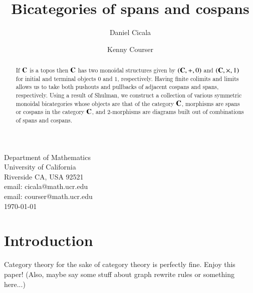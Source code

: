 \documentclass[oneside]{amsart}
\title{Bicategories of spans and cospans}
\author{Daniel Cicala}
\author{Kenny Courser}
\theoremstyle{definition}
\theoremstyle{remark}
\numberwithin{equation}{section}
\begin{document}
\maketitle
\begin{center}   
  {\small Department of Mathematics  \\
    University of California  \\
  Riverside CA, USA 92521  \\ }
  \vspace{0.3cm}   
  {\small email: cicala@math.ucr.edu\\}
  {\small email: courser@math.ucr.edu\\} 
  \vspace{0.3cm}   
  {\small \today}
  \vspace{0.3cm}   
\end{center}   

\begin{abstract}
\noindent
If $\bold{C}$ is a topos then $\bold{C}$ has two monoidal structures given by $(\bold{C},+,0)$ and $(\bold{C},\times,1)$ for initial and terminal objects $0$ and $1$, respectively. Having finite colimits and limits allows us to take both pushouts and pullbacks of adjacent cospans and spans, respectively. Using a result of Shulman, we construct a collection of various symmetric monoidal bicategories whose objects are that of the category $\bold{C}$, morphisms are spans or cospans in the category $\bold{C}$, and 2-morphisms are diagrams built out of combinations of spans and cospans.
\end{abstract}

\section{Introduction}
Category theory for the sake of category theory is perfectly fine. Enjoy this paper! (Also, maybe say some stuff about graph rewrite rules or something here...)
\end{document}
